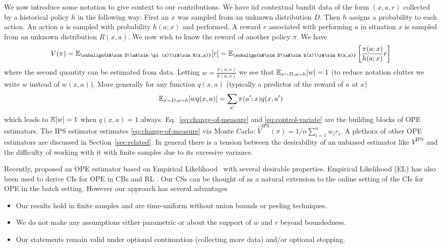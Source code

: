 We now introduce some notation to give 
context to our contributions.
We have iid contextual bandit data of the form $(x,a,r)$
collected by a historical policy $h$ in the following way:
First an $x$ was sampled from an unknown distribution $D$. 
Then $h$ assigns a probability to each action. 
An action $a$ is sampled with probability $h(a;x)$
and performed. A reward $r$ associated with performing $a$ in
situation $x$ is sampled from an unknown distribution $R(x,a)$. 
We now wish to know the reward of another policy $\pi$. We have
\begin{equation}
\label{eq:change-of-measure}
V(\pi) = \E_{\subalign{x&\sim D\\a&\sim\pi(x)\\r&\sim R(x,a)}}[r]
=
\E_{\subalign{x&\sim D\\a&\sim h(x)\\r&\sim R(x,a)}}\left[\frac{\pi(a;x)}{h(a;x)}r\right]
\end{equation}
where the second quantity can be estimated from 
data.%
Letting $w=\frac{\pi(a;x)}{h(a;x)}$  we see that 
$\mathbb{E}_{x\sim D,a\sim h}[w]=1$
(to reduce notation 
clutter we write $w$ instead of $w(x,a)$). More generally 
for any function $q(x,a)$ (typically
a predictor of the reward of $a$ at $x$)
\begin{equation}
\label{eq:control-variate}
\mathbb{E}_{x\sim D,a\sim h}[w q(x,a)] = \sum_{a'} \pi(a';x) q(x,a')    
\end{equation}
which leads to $\mathbb{E}[w]=1$ when $q(x,a)=1$ always. Eq.~\eqref{eq:change-of-measure} and \eqref{eq:control-variate}
are the building blocks of OPE estimators.
The IPS estimator \cite{HT52} estimates
\eqref{eq:change-of-measure} via Monte Carlo: $\hat{V}^{\textrm{IPS}}(\pi) = 1/n \sum_{i=1}^n w_i r_i $.
A plethora of other OPE estimators are discussed in Section~\ref{sec:related}. In general there is
a tension between the desirability of an unbiased estimator
like $V^{\textrm{IPS}}$ and the difficulty of working with it
with finite samples due to its excessive variance.


Recently, \cite{kallus2019intrinsically} proposed an OPE estimator 
based on Empirical Likelihood~\cite{owen2001empirical} with several
desirable properties. Empirical Likelihood (EL) has also been used to 
derive CIs for OPE in CBs \cite{karampatziakis2019empirical} 
and RL \cite{dai2020coindice}. Our CSs can be thought of as a natural 
extension to the online setting of the CIs 
for OPE in the batch setting. However our approach 
has several advantages
\begin{itemize}
\item Our results hold in finite samples and are
time-uniform without union bounds or peeling techniques.
\item We do not make any assumptions either parametric 
or about the support of $w$ and $r$ beyond boundedness.

\item Our statements remain valid under optional 
continuation (collecting more data) and/or optional stopping.
\end{itemize}

